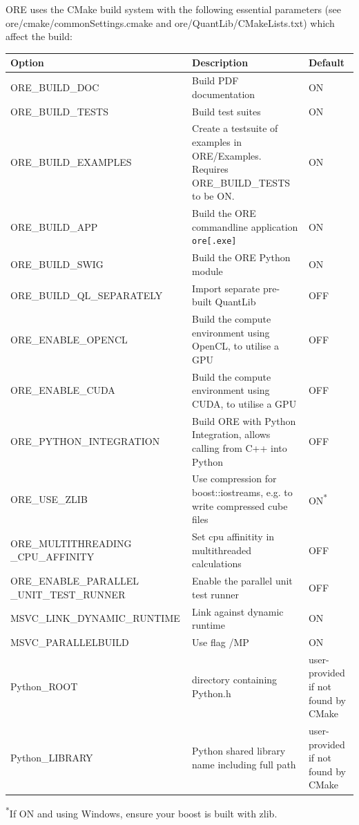 ORE uses the CMake build system with the following essential parameters (see ore/cmake/commonSettings.cmake and
ore/QuantLib/CMakeLists.txt) which affect the build:

{\scriptsize
\begin{tabular}{|p{5.5cm}|p{6cm}|p{3cm}|}
  \hline
  Option & Description & Default  \\
  \hline
  \hline
  ORE\_BUILD\_DOC & Build PDF documentation & ON \\
  \hline
  ORE\_BUILD\_TESTS & Build test suites  & ON \\
  \hline
  ORE\_BUILD\_EXAMPLES & Create a testsuite of examples in ORE/Examples. Requires ORE\_BUILD\_TESTS to be ON. & ON \\
  \hline
  ORE\_BUILD\_APP & Build the ORE commandline application {\tt ore[.exe]} & ON \\
  \hline
  ORE\_BUILD\_SWIG & Build the ORE Python module & ON \\
  \hline
  ORE\_BUILD\_QL\_SEPARATELY & Import separate pre-built QuantLib & OFF \\
  \hline
  ORE\_ENABLE\_OPENCL & Build the compute environment using OpenCL, to utilise a GPU & OFF \\
  \hline
  ORE\_ENABLE\_CUDA & Build the compute environment using CUDA, to utilise a GPU & OFF \\
  \hline
  ORE\_PYTHON\_INTEGRATION & Build ORE with Python Integration, allows calling from C++ into Python & OFF \\
  \hline
  ORE\_USE\_ZLIB & Use compression for boost::iostreams, e.g. to write compressed cube files & ON\textsuperscript{*} \\
  \hline
  ORE\_MULTITHREADING \_CPU\_AFFINITY & Set cpu affinitity in multithreaded calculations & OFF  \\
  \hline
  ORE\_ENABLE\_PARALLEL \_UNIT\_TEST\_RUNNER & Enable the parallel unit test runner & OFF  \\
  \hline
  MSVC\_LINK\_DYNAMIC\_RUNTIME & Link against dynamic runtime & ON \\
  \hline
  MSVC\_PARALLELBUILD & Use flag /MP & ON \\
  \hline
  Python\_ROOT & directory containing Python.h & user-provided if not found by CMake \\
  \hline
  Python\_LIBRARY & Python shared library name including full path & user-provided if not found by CMake \\
  \hline
\end{tabular}
}
{\scriptsize \textsuperscript{*}If ON and using Windows, ensure your boost is built with zlib.}


